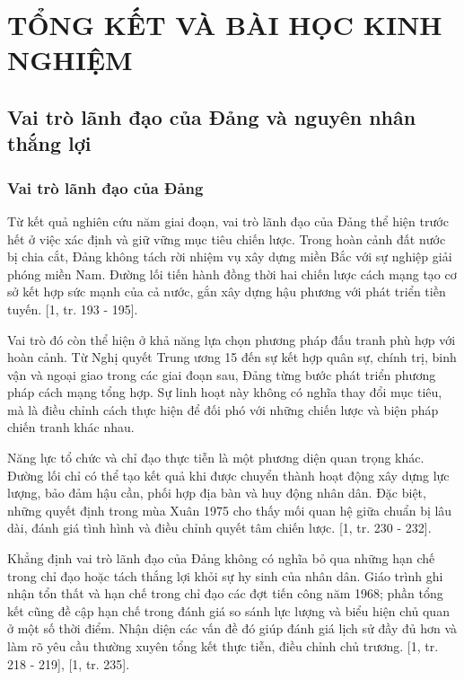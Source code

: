 \chapter{TỔNG KẾT VÀ BÀI HỌC KINH NGHIỆM}

\section{Vai trò lãnh đạo của Đảng và nguyên nhân thắng lợi}

\subsection{Vai trò lãnh đạo của Đảng}

Từ kết quả nghiên cứu năm giai đoạn, vai trò lãnh đạo của Đảng thể hiện trước hết ở việc xác định và giữ vững mục tiêu chiến lược. Trong hoàn cảnh đất nước bị chia cắt, Đảng không tách rời nhiệm vụ xây dựng miền Bắc với sự nghiệp giải phóng miền Nam. Đường lối tiến hành đồng thời hai chiến lược cách mạng tạo cơ sở kết hợp sức mạnh của cả nước, gắn xây dựng hậu phương với phát triển tiền tuyến. [1, tr. 193 - 195].

Vai trò đó còn thể hiện ở khả năng lựa chọn phương pháp đấu tranh phù hợp với hoàn cảnh. Từ Nghị quyết Trung ương 15 đến sự kết hợp quân sự, chính trị, binh vận và ngoại giao trong các giai đoạn sau, Đảng từng bước phát triển phương pháp cách mạng tổng hợp. Sự linh hoạt này không có nghĩa thay đổi mục tiêu, mà là điều chỉnh cách thực hiện để đối phó với những chiến lược và biện pháp chiến tranh khác nhau.

Năng lực tổ chức và chỉ đạo thực tiễn là một phương diện quan trọng khác. Đường lối chỉ có thể tạo kết quả khi được chuyển thành hoạt động xây dựng lực lượng, bảo đảm hậu cần, phối hợp địa bàn và huy động nhân dân. Đặc biệt, những quyết định trong mùa Xuân 1975 cho thấy mối quan hệ giữa chuẩn bị lâu dài, đánh giá tình hình và điều chỉnh quyết tâm chiến lược. [1, tr. 230 - 232].

Khẳng định vai trò lãnh đạo của Đảng không có nghĩa bỏ qua những hạn chế trong chỉ đạo hoặc tách thắng lợi khỏi sự hy sinh của nhân dân. Giáo trình ghi nhận tổn thất và hạn chế trong chỉ đạo các đợt tiến công năm 1968; phần tổng kết cũng đề cập hạn chế trong đánh giá so sánh lực lượng và biểu hiện chủ quan ở một số thời điểm. Nhận diện các vấn đề đó giúp đánh giá lịch sử đầy đủ hơn và làm rõ yêu cầu thường xuyên tổng kết thực tiễn, điều chỉnh chủ trương. [1, tr. 218 - 219], [1, tr. 235].

